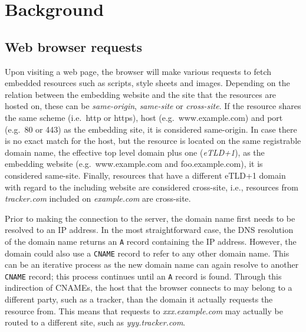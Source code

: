 \section{Background}


\subsection{Web browser requests}
Upon visiting a web page, the browser will make various requests to fetch embedded resources such as scripts, style sheets and images.
Depending on the relation between the embedding website and the site that the resources are hosted on, these can be \textit{same-origin}, \textit{same-site} or \textit{cross-site}.
If the resource shares the same scheme (i.e.\ http or https), host (e.g.\ www.example.com) and port (e.g.\ 80 or 443) as the embedding site, it is considered same-origin.
In case there is no exact match for the host, but the resource is located on the same registrable domain name, the effective top level domain plus one (\textit{eTLD+1}), as the embedding website (e.g.\ www.example.com and foo.example.com), it is considered same-site.
Finally, resources that have a different eTLD+1 domain with regard to the including website are considered cross-site, i.e., resources from \textit{tracker.com} included on \textit{example.com} are cross-site.

Prior to making the connection to the server, the domain name first needs to be resolved to an IP address.
In the most straightforward case, the DNS resolution of the domain name returns an \texttt{A} record containing the IP address.
However, the domain could also use a \texttt{CNAME} record to refer to any other domain name.
This can be an iterative process as the new domain name can again resolve to another \texttt{CNAME} record; this process continues until an \texttt{A} record is found.
Through this indirection of CNAMEs, the host that the browser connects to may belong to a different party, such as a tracker, than the domain it actually requests the resource from.
This means that requests to \textit{xxx.example.com} may actually be routed to a different site, such as \textit{yyy.tracker.com}.

